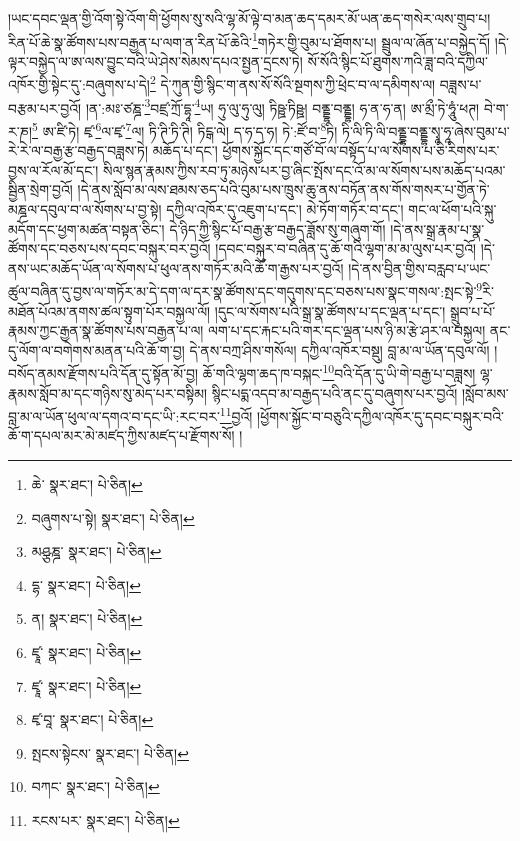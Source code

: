 །ཡང་དབང་ལྡན་གྱི་འོག་སྟེ་འོག་གི་ཕྱོགས་སུ་སའི་ལྷ་མོ་ལྟེ་བ་མན་ཆད་དམར་མོ་ཡན་ཆད་གསེར་ལས་གྲུབ་པ། རིན་པོ་ཆེ་སྣ་ཚོགས་པས་བརྒྱན་པ་ལག་ན་རིན་པོ་ཆེའི་\footnote{ཆེ་  སྣར་ཐང་།  པེ་ཅིན། }གཏེར་གྱི་བུམ་པ་ཐོགས་པ། སྦྲུལ་ལ་ཞོན་པ་བསྐྱེད་དོ། །དེ་ལྟར་བསྐྱེད་ལ་ཨ་ལས་བྱུང་བའི་ཡེ་ཤེས་སེམས་དཔའ་སྤྱན་དྲངས་ཏེ། སོ་སོའི་སྙིང་པོ་ཐུགས་ཀའི་ཟླ་བའི་དཀྱིལ་འཁོར་གྱི་སྟེང་དུ་:བཞུགས་པ་དེ།\footnote{བཞུགས་པ་སྟེ།  སྣར་ཐང་།  པེ་ཅིན། } དེ་ཀུན་གྱི་སྙིང་ག་ནས་སོ་སོའི་སྔགས་ཀྱི་ཕྲེང་བ་ལ་དམིགས་ལ། བཟླས་པ་བརྩམ་པར་བྱའོ། །ན་:མཿ་ཙཎྜ་\footnote{མཤྩཎྜ་  སྣར་ཐང་།  པེ་ཅིན། }བཛྲ་ཀྲོ་དྷཱ་\footnote{དྷ་  སྣར་ཐང་།  པེ་ཅིན། }ཡ། ཧུ་ལུ་ཧུ་ལུ། ཏིཥྛ་ཏིཥྛ། བནྡྷ་བནྡྷ། ཧ་ན་ཧ་ན། ཨ་མྲྀ་ཏེ་ཧཱུཾ་ཕཊ། བེ་ག་ར་ཎ།\footnote{ན།  སྣར་ཐང་།  པེ་ཅིན། } ཨ་ཛི་ཏེ། ཛྭ་\footnote{ཛྭཱ་  སྣར་ཐང་།  པེ་ཅིན། }ལ་ཛྭ་\footnote{ཛྭཱ་  སྣར་ཐང་།  པེ་ཅིན། }ལ། ཏི་ཊི་ཏི་ཊི། ཏིངྒ་ལེ། ད་ཧ་ད་ཧ། ཏེ་:ཛོ་བ་\footnote{ཛྭ་བཱ་  སྣར་ཐང་།  པེ་ཅིན། }ཏི། ཏི་ལི་ཏི་ལི་བནྡྷ་བནྡྷ་སྭཱ་ཧཱ་ཞེས་བུམ་པ་རེ་རེ་ལ་བརྒྱ་རྩ་བརྒྱད་བཟླས་ཏེ། མཆོད་པ་དང་། ཕྱོགས་སྐྱོང་དང་གཙོ་བོ་ལ་བསྟོད་པ་ལ་སོགས་པ་ཅི་རིགས་པར་བྱས་ལ་རོལ་མོ་དང་། སིལ་སྙན་རྣམས་ཀྱིས་རབ་ཏུ་མཉེས་པར་བྱ་ཞིང་སྤོས་དང་འོ་མ་ལ་སོགས་པས་མཆོད་པའམ་སྦྱིན་སྲེག་བྱའོ། །དེ་ནས་སློབ་མ་ལས་ཐམས་ཅད་པའི་བུམ་པས་ཁྲུས་ཆུ་ནས་བཏོན་ནས་གོས་གསར་པ་གྱོན་ཏེ་མཎྜལ་དབུལ་བ་ལ་སོགས་པ་བྱ་སྟེ། དཀྱིལ་འཁོར་དུ་འཇུག་པ་དང་། མེ་ཏོག་གཏོར་བ་དང་། གང་ལ་ཕོག་པའི་སྐུ་མདོག་དང་ཕྱག་མཚན་བསྟན་ཅིང་། དེ་ཉིད་ཀྱི་སྙིང་པོ་བརྒྱ་རྩ་བརྒྱད་ཟློས་སུ་གཞུག་གོ། །དེ་ནས་སྒྲ་རྣམ་པ་སྣ་ཚོགས་དང་བཅས་པས་དབང་བསྐུར་བར་བྱའོ། །དབང་བསྐུར་བ་བཞིན་དུ་ཆོ་གའི་ལྷག་མ་མ་ལུས་པར་བྱའོ། །དེ་ནས་ཡང་མཆོད་ཡོན་ལ་སོགས་པ་ཕུལ་ནས་གཏོར་མའི་ཆོ་ག་རྒྱས་པར་བྱའོ། །དེ་ནས་བྱིན་གྱིས་བརླབ་པ་ཡང་ཚུལ་བཞིན་དུ་བྱས་ལ་གཏོར་མ་དེ་དག་ལ་དར་སྣ་ཚོགས་དང་གདུགས་དང་བཅས་པས་སྣང་གསལ་:སྤང་སྟེ་\footnote{སྤངས་སྟེངས་  སྣར་ཐང་།  པེ་ཅིན། }རི་མཐོན་པོའམ་ནགས་ཚལ་སྟུག་པོར་བསྐྱལ་ལོ། །དུང་ལ་སོགས་པའི་སྒྲ་སྣ་ཚོགས་པ་དང་ལྡན་པ་དང་། སྒྲུབ་པ་པོ་རྣམས་ཀྱང་རྒྱན་སྣ་ཚོགས་པས་བརྒྱན་པ་ལ། ལག་པ་དང་རྐང་པའི་གར་དང་ལྡན་པས་ཉི་མ་རྩེ་ཤར་ལ་བསྐྱལ། ནང་དུ་ལོག་ལ་བགེགས་མནན་པའི་ཆོ་ག་བྱ། དེ་ནས་བཀྲ་ཤིས་གསོལ། དཀྱིལ་འཁོར་བསྡུ། བླ་མ་ལ་ཡོན་དབུལ་ལོ། །བསོད་ནམས་རྫོགས་པའི་དོན་དུ་སྟོན་མོ་བྱ། ཆོ་གའི་ལྷག་ཆད་ཁ་བསྐང་\footnote{བཀང་  སྣར་ཐང་།  པེ་ཅིན། }བའི་དོན་དུ་ཡི་གེ་བརྒྱ་པ་བཟླས། ལྷ་རྣམས་སློབ་མ་དང་གཉིས་སུ་མེད་པར་བསྟིམ། སྙིང་པདྨ་འདབ་མ་བརྒྱད་པའི་ནང་དུ་བཞུགས་པར་བྱའོ། །སློབ་མས་བླ་མ་ལ་ཡོན་ཕུལ་ལ་དགའ་བ་དང་ཡི་:རང་བར་\footnote{རངས་པར་  སྣར་ཐང་།  པེ་ཅིན། }བྱའོ། །ཕྱོགས་སྐྱོང་བ་བཅུའི་དཀྱིལ་འཁོར་དུ་དབང་བསྐུར་བའི་ཆོ་ག་དཔལ་མར་མེ་མཛད་ཀྱིས་མཛད་པ་རྫོགས་སོ། ། 
